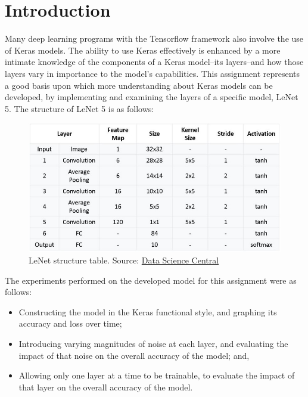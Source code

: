 \documentclass{article}
\begin{document}
  
  \graphicspath{{./images/}}
\section{Introduction}
Many deep learning programs with the Tensorflow framework also involve the use of Keras models.
The ability to use Keras effectively is enhanced by a more intimate knowledge of the components of a Keras model--its layers--and how those layers vary in importance to the model's capabilities.
This assignment represents a good basis upon which more understanding about Keras models can be developed, by implementing and examining the layers of a specific model, LeNet 5.
The structure of LeNet 5 is as follows:

\begin{figure}[H]
    \centering
    \includegraphics[width=6in]{csci-8920/hw-2/images/LeNet_structure.jpeg}
    \caption{LeNet structure table. Source: \href{https://www.datasciencecentral.com/profiles/blogs/lenet-5-a-classic-cnn-architecture}{Data Science Central}}
    \label{fig:lenet-table}
\end{figure}

The experiments performed on the developed model for this assignment were as follows:
\begin{itemize}
    \item Constructing the model in the Keras functional style, and graphing its accuracy and loss over time;
    \item Introducing varying magnitudes of noise at each layer, and evaluating the impact of that noise on the overall accuracy of the model; and,
    \item Allowing only one layer at a time to be trainable, to evaluate the impact of that layer on the overall accuracy of the model.
\end{itemize}
\end{document}
